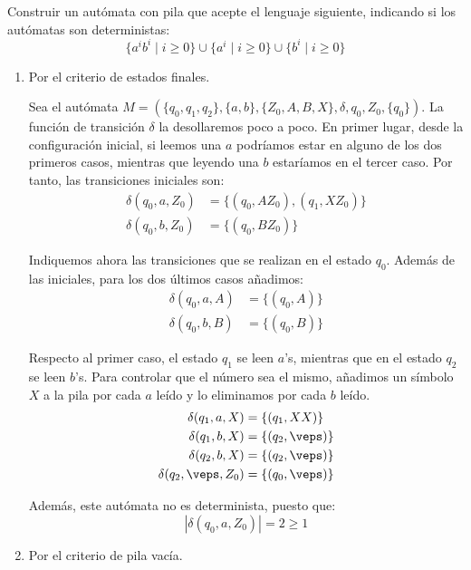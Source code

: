 \begin{ejercicio}\label{ej:1.5.2}
    Construir un autómata con pila que acepte el lenguaje siguiente, indicando si los autómatas son deterministas:
    \begin{equation*}
        \{a^ib^i \mid i\geq 0\} \cup \{a^i \mid i \geq 0\} \cup \{b^i \mid i \geq 0\}
    \end{equation*}
    \begin{enumerate}
        \item Por el criterio de estados finales.
        
        Sea el autómata $M = (\{q_0,q_1,q_2\},\{a,b\},\{Z_0,A,B,X\},\delta,q_0,Z_0,\{q_0\})$. La función de transición $\delta$ la desollaremos poco a poco. En primer lugar, desde la configuración inicial, si leemos una $a$ podríamos estar en alguno de los dos primeros casos, mientras que leyendo una $b$ estaríamos en el tercer caso. Por tanto, las transiciones iniciales son:
        \begin{align*}
            \delta(q_0,a,Z_0) &= \{(q_0,AZ_0), (q_1, XZ_0)\} \\
            \delta(q_0,b,Z_0) &= \{(q_0,BZ_0)\}
        \end{align*}

        Indiquemos ahora las transiciones que se realizan en el estado $q_0$. Además de las iniciales, para los dos últimos casos añadimos:
        \begin{align*}
            \delta(q_0,a,A) &= \{(q_0,A)\} \\
            \delta(q_0,b,B) &= \{(q_0,B)\}
        \end{align*}

        Respecto al primer caso, el estado $q_1$ se leen $a$'s, mientras que en el estado $q_2$ se leen $b$'s. Para controlar que el número sea el mismo, añadimos un símbolo $X$ a la pila por cada $a$ leído y lo eliminamos por cada $b$ leído.
        \begin{align*}
            \delta(q_1,a,X) &= \{(q_1,XX)\} \\
            \delta(q_1,b,X) &= \{(q_2,\veps)\} \\
            \delta(q_2,b,X) &= \{(q_2,\veps)\} \\
            \delta(q_2,\veps,Z_0) &= \{(q_0,\veps)\}
        \end{align*}

        Además, este autómata no es determinista, puesto que:
        \begin{equation*}
            |\delta(q_0,a,Z_0)|=2\geq 1
        \end{equation*}
        \item Por el criterio de pila vacía.
        

\end{enumerate}
\end{ejercicio}
